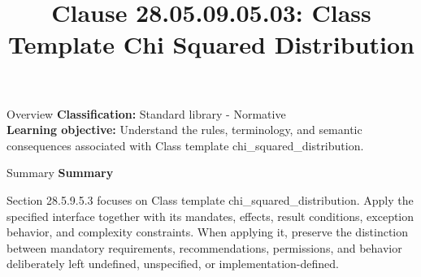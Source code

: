 \documentclass[10pt,letterpaper]{article}
\title{Clause 28.05.09.05.03: Class Template Chi Squared Distribution}
\author{}
\date{}
\begin{document}
\maketitle
\begin{CornellOverviewBox}{Overview}
\textbf{Classification:} Standard library - Normative\\[2pt]
\textbf{Learning objective:} Understand the rules, terminology, and semantic consequences associated with Class template chi\_squared\_distribution.
\end{CornellOverviewBox}\begin{CornellSummaryBox}{Summary}
{\sffamily\bfseries\color{Accent} Summary}\par\vspace{3pt}Section 28.5.9.5.3 focuses on Class template chi\_squared\_distribution. Apply the specified interface together with its mandates, effects, result conditions, exception behavior, and complexity constraints. When applying it, preserve the distinction between mandatory requirements, recommendations, permissions, and behavior deliberately left undefined, unspecified, or implementation-defined.
\end{CornellSummaryBox}
\end{document}
